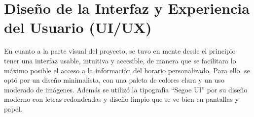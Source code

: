\section{Diseño de la Interfaz y Experiencia del Usuario (UI/UX)}

En cuanto a la parte visual del proyecto, se tuvo en mente desde el principio tener una interfaz usable, intuitiva y accesible, de manera que se facilitara lo máximo posible el acceso a la información del horario personalizado.
\newline\newline
Para ello, se optó por un diseño minimalista, con una paleta de colores clara y un uso moderado de imágenes. Además se utilizó la tipografía ``Segoe UI'' por su diseño moderno con letras redondeadas y diseño limpio que se ve bien en pantallas y papel.
\newline
